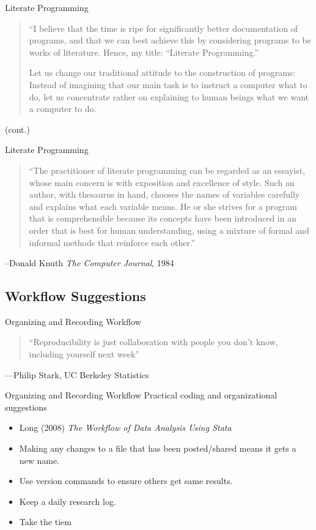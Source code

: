 \documentclass{beamer}
\begin{document}
\begin{frame}{Literate Programming}
\begin{quote}
``I believe that the time is ripe for significantly better documentation of programs, and that we can best achieve this by considering programs to be works of literature. Hence, my title: ``Literate Programming.''

Let us change our traditional attitude to the construction of programs: Instead of imagining that our main task is to instruct a computer what to do, let us concentrate rather on explaining to human beings what we want a computer to do.
\end{quote}
(cont.)
\end{frame}

\begin{frame}{Literate Programming}
\begin{quote}
``The practitioner of literate programming can be regarded as an essayist, whose main concern is with exposition and excellence of style. Such an author, with thesaurus in hand, chooses the names of variables carefully and explains what each variable means. He or she strives for a program that is comprehensible because its concepts have been introduced in an order that is best for human understanding, using a mixture of formal and informal methods that reinforce each other.''
\end{quote}
--Donald Knuth \textit{The Computer Journal}, 1984
\href{http://www.literateprogramming.com/index.html}{}
\href{http://comjnl.oxfordjournals.org/content/27/2/97.full.pdf+html}{}
\end{frame}

\subsection{Workflow Suggestions}
\begin{frame}{Organizing and Recording Workflow}
\begin{quote}
``Reproducibility is just collaboration with people you don't know,
including yourself next week''
\end{quote}
\begin{flushright}
---Philip Stark, UC Berkeley Statistics
\end{flushright}
\end{frame}

\begin{frame}{Organizing and Recording Workflow}
 Practical coding and organizational suggestions
 \begin{itemize}
 \item Long (2008) \textit{The Workflow of Data Analysis Using Stata}
 \item Making any changes to a file that has been posted/shared means it gets a new name.
 \item Use version commands to ensure others get same results.
 \item Keep a daily research log.
 \item Take the tiem 
\end{itemize}
\end{frame}
\end{document}
